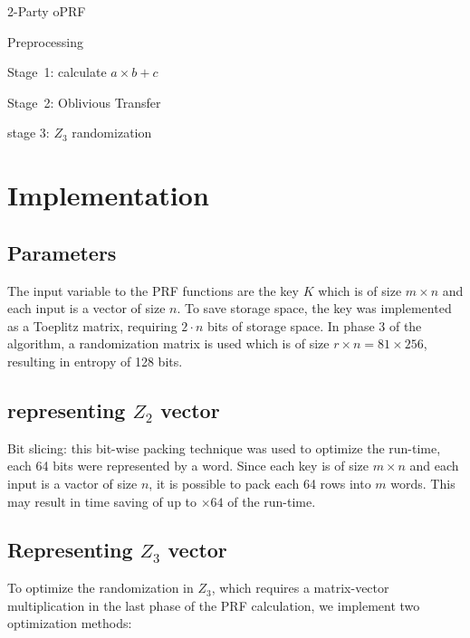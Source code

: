 \begin{algorithm}
	\caption{2-Party oPRF}
	\begin{algorithmic}
		
		\STATE Preprocessing
		
		\STATE Stage\ 1: calculate $a \times b \plus c$
		
		\STATE Stage\ 2: Oblivious Transfer
		
		\STATE stage 3: $Z_3$ randomization  
		
	\end{algorithmic}
\end{algorithm}

\fi


\section{Implementation}
\label{sec:technical_overview}





\subsection{Parameters}
The input variable to the PRF functions are the key $K$ which is of size $m \times n$ and each input is a vector of size $n$. 
To save storage space, the key was implemented as a Toeplitz matrix, requiring $2 \cdot n$ bits of storage space.
In phase 3 of the algorithm, a randomization matrix is used which is of size $r \times n = 81 \times 256$, resulting in entropy of 128 bits.

\subsection{representing $Z_2$ vector}

Bit slicing: this bit-wise packing technique was used to optimize the run-time, each 64 bits were represented by a word. Since each key is of size $m \times n$ and each input is a vactor of size $n$, it is possible to pack each 64 rows into $m$ words. This may result in time saving of up to $\times 64$ of the run-time.

\subsection{Representing $Z_3$ vector}

To optimize the randomization in $Z_3$, which requires a matrix-vector multiplication in the last phase of the PRF calculation, we implement two optimization methods:

